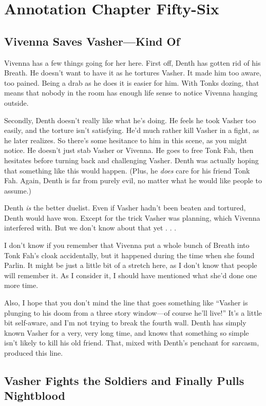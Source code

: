 \section{Annotation Chapter Fifty-Six}

\subsection*{Vivenna Saves Vasher—Kind Of}

Vivenna has a few things going for her here. First off, Denth has gotten rid of his Breath. He doesn’t want to have it as he tortures Vasher. It made him too aware, too pained. Being a drab as he does it is easier for him. With Tonks dozing, that means that nobody in the room has enough life sense to notice Vivenna hanging outside.

Secondly, Denth doesn’t really like what he’s doing. He feels he took Vasher too easily, and the torture isn’t satisfying. He’d much rather kill Vasher in a fight, as he later realizes. So there’s some hesitance to him in this scene, as you might notice. He doesn’t just stab Vasher or Vivenna. He goes to free Tonk Fah, then hesitates before turning back and challenging Vasher. Denth was actually hoping that something like this would happen. (Plus, he \textit{does} care for his friend Tonk Fah. Again, Denth is far from purely evil, no matter what he would like people to assume.)

Denth \textit{is} the better duelist. Even if Vasher hadn’t been beaten and tortured, Denth would have won. Except for the trick Vasher was planning, which Vivenna interfered with. But we don’t know about that yet . . .

I don’t know if you remember that Vivenna put a whole bunch of Breath into Tonk Fah’s cloak accidentally, but it happened during the time when she found Parlin. It might be just a little bit of a stretch here, as I don’t know that people will remember it. As I consider it, I should have mentioned what she’d done one more time.

Also, I hope that you don’t mind the line that goes something like “Vasher is plunging to his doom from a three story window—of course he’ll live!” It’s a little bit self-aware, and I’m not trying to break the fourth wall. Denth has simply known Vasher for a very, very long time, and knows that something so simple isn’t likely to kill his old friend. That, mixed with Denth’s penchant for sarcasm, produced this line.

\subsection*{Vasher Fights the Soldiers and Finally Pulls Nightblood}

